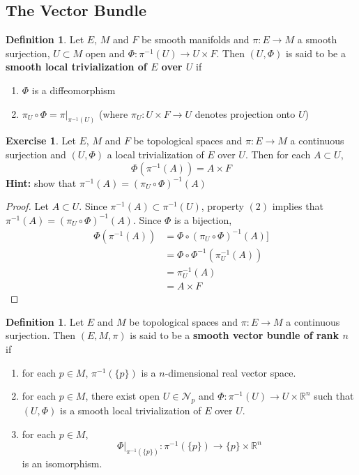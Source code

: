 \documentclass[12pt]{amsart}
\theoremstyle{definition}
\newtheorem{defn}[definition]{Definition}
\newtheorem{ex}[definition]{Exercise}
\newcommand{\R}{\mathbb{R}}
\newcommand{\MN}{\mathcal{N}}
\begin{document}
	\subsection{The Vector Bundle}
	
	\begin{defn}
		Let $E$, $M$ and $F$ be smooth manifolds and $\pi: E \rightarrow M$ a smooth surjection, $U \subset M$ open and $\Phi: \pi^{-1}(U) \rightarrow U \times F$. Then $(U, \Phi)$ is said to be a \textbf{smooth local trivialization of $E$ over $U$}  if 
		\begin{enumerate}
			\item $\Phi$ is a diffeomorphism
			\item $\pi_U \circ \Phi = \pi|_{\pi^{-1}(U)}$ (where $\pi_U: U \times F \rightarrow U$ denotes projection onto $U$)
		\end{enumerate}
	\end{defn}

	\begin{ex}
		Let $E$, $M$ and $F$ be topological spaces and $\pi: E \rightarrow M$ a continuous surjection and $(U, \Phi)$ a local trivialization of $E$ over $U$. Then for each $A \subset U$, $$\Phi ( \pi^{-1}(A)) = A \times F$$
		\textbf{Hint:} show that $\pi^{-1}(A) = (\pi_U \circ \Phi)^{-1}(A)$
	\end{ex}
	
	\begin{proof}
		Let $A \subset U$. Since $ \pi^{-1}(A) \subset \pi^{-1}(U)$, property $(2)$ implies that $\pi^{-1}(A) = (\pi_U \circ \Phi)^{-1}(A)$. Since $\Phi$ is a bijection, 
		\begin{align*}
			\Phi (\pi^{-1}(A))
			&= \Phi \circ (\pi_U \circ \Phi)^{-1}(A)] \\
			&= \Phi \circ {\Phi}^{-1} (\pi_U^{-1}(A)) \\
			&= \pi_U^{-1}(A) \\
			&= A \times F
		\end{align*}
	\end{proof}

	\begin{defn}
		Let $E$ and $M$ be topological spaces and $\pi: E \rightarrow M$ a continuous surjection. Then $(E, M, \pi)$ is said to be a \textbf{smooth vector bundle of rank $n$} if 
		\begin{enumerate}
			\item for each $p \in M$, $\pi^{-1}(\{p\})$ is a $n$-dimensional real vector space.
			\item for each $p \in M$, there exist open $U \in \MN_p$ and $\Phi: \pi^{-1}(U) \rightarrow U \times \R^n$ such that $(U, \Phi)$ is a smooth local trivialization of $E$ over $U$.
			\item for each $p \in M$, $$\Phi|_{\pi^{-1}(\{p\})}: \pi^{-1}(\{p\}) \rightarrow \{p\} \times \R^n$$ is an isomorphism. 
		\end{enumerate}
	\end{defn}
\end{document}
